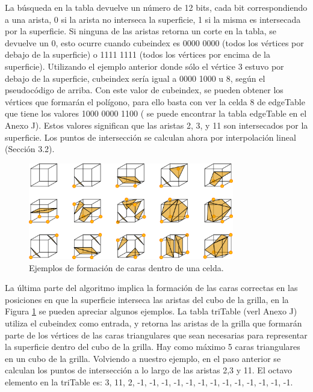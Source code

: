 \documentclass[12pt]{article}
\begin{document}
La búsqueda en la tabla devuelve un número de 12 bits, cada bit correspondiendo a una arista, 0 si la arista no interseca la superficie, 1 si la misma es intersecada por la superficie. Si ninguna de las aristas retorna un corte en la tabla, se devuelve un 0, esto ocurre cuando cubeindex es 0000 0000 (todos los vértices por debajo de la superficie) o 1111 1111 (todos los vértices por encima de la superficie).
Utilizando el ejemplo anterior donde sólo el vértice 3 estuvo por debajo de la superficie, cubeindex sería igual a 0000 1000 u 8, según el pseudocódigo de arriba. Con este valor de cubeindex, se pueden obtener los vértices que formarán el polígono, para ello basta con ver la celda 8 de edgeTable que tiene los valores 1000 0000 1100 ( se puede encontrar la tabla edgeTable en el Anexo J). Estos valores significan que las aristas 2, 3, y 11 son intersecados por la superficie. Los puntos de intersección se calculan ahora por interpolación lineal (Sección 3.2).

\begin{figure}[h!]
\includegraphics[width=0.8\textwidth,center]{marchingcubes3.png}
\caption{Ejemplos de formación de caras dentro de una celda.}
\label{mc3}
\end{figure}

La última parte del algoritmo implica la formación de las caras correctas en las posiciones en que la superficie interseca las aristas del cubo de la grilla, en la Figura \ref{mc3} se pueden apreciar algunos ejemplos. La tabla triTable (verl Anexo J) utiliza el cubeindex como entrada, y retorna las aristas de la grilla que  formarán parte de los vértices de las caras triangulares que sean necesarias para representar la superficie dentro del cubo de la grilla. Hay como máximo 5 caras triangulares en un cubo de la grilla.
Volviendo a nuestro ejemplo, en el paso anterior se calculan los puntos de intersección a lo largo de las aristas 2,3 y 11. El octavo elemento en la triTable es:
{3, 11, 2, -1, -1, -1, -1, -1, -1, -1, -1, -1, -1, -1, -1, -1}.
\end{document}
